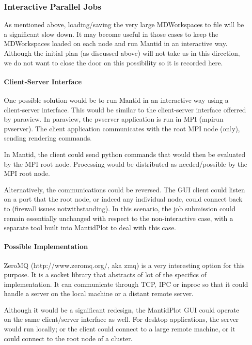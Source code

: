 \subsubsection{Interactive Parallel Jobs}

As mentioned above, loading/saving the very large MDWorkspaces to file will be a significant slow down. It may become useful in those cases to keep the MDWorkspaces loaded on each node and run Mantid in an interactive way. Although the initial plan (as discussed above) will not take us in this direction, we do not want to close the door on this possibility so it is recorded here.

\paragraph{Client-Server Interface}

One possible solution would be to run Mantid in an interactive way using a client-server interface. This would be similar to the client-server interface offerred by paraview. In paraview, the pvserver application is run in MPI (mpirun pvserver). The client application communicates with the root MPI node (only), sending rendering commands.

In Mantid, the client could send python commands that would then be evaluated by the MPI root node. Processing would be distributed as needed/possible by the MPI root node.

Alternatively, the communications could be reversed. The GUI client could listen on a port that the root node, or indeed any individual node, could connect back to (firewall issues notwithstanding). In this scenario, the job submission could remain essentially unchanged with respect to the non-interactive case, with a separate tool built into MantidPlot to deal with this case.

\paragraph{Possible Implementation}

ZeroMQ (http://www.zeromq.org/, aka zmq) is a very interesting option for this purpose. It is a socket library that abstracts of lot of the specifics of implementation. It can communicate through TCP, IPC or inproc so that it could handle a server on the local machine or a distant remote server.

Although it would be a significant redesign, the MantidPlot GUI could operate on the same client/server interface as well. For desktop applications, the server would run locally; or the client could connect to a large remote machine, or it could connect to the root node of a cluster.

